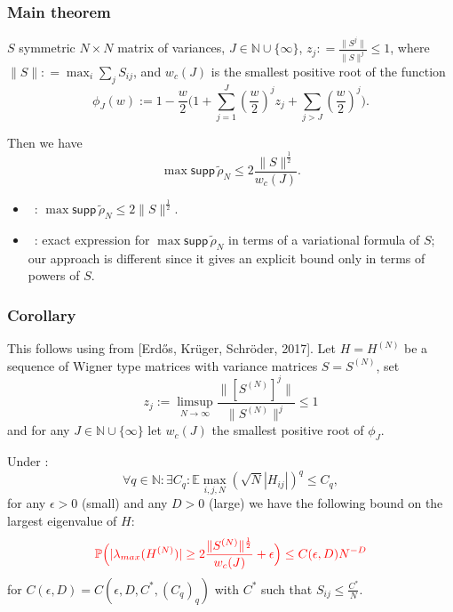 \documentclass{beamer}
\numberwithin{equation}{section}
\newcommand{\deq}{\mathrel{\mathop:}=}
\newcommand{\supp}{\mathsf{supp}\,}
\newcommand{\E}{{\mathbb E }}
\newcommand{\N}{{\mathbb N}}
\renewcommand{\P}{{\mathbb P}}
\newcommand{\Cr}{\color{red}}
\renewcommand{\emph}[1]{{\Cr{#1}}}
\newcommand{\bemph}[1]{\textbf{\Cr{#1}}}
\begin{document}
\begin{frame}
\frametitle{Main theorem}
$S$ symmetric $N\times N$ matrix of variances, $J\in\N\cup\{\infty\}$, $z_j\deq\frac{\|S^j\|}{\|S\|^j}\leq 1$, where $\|S\|\deq\max_i\sum_j S_{ij}$, and $w_c(J)$ is the smallest positive root of the function $$
\phi_J(w):=1-\frac{w}{2}\Big(1+\sum_{j=1}^J\left(\frac{w}{2}\right)^jz_j+\sum_{j>J}\left(\frac{w}{2}\right)^j\Big).$$
	
	Then we have  $$\max\supp\widetilde\rho_N\leq 2\frac{\|S\|^\frac{1}{2}}{w_c(J)}.$$

\bemph{Comparison to existing literature:} 
\begin{itemize}
	\item ~\!: $\max\supp\widetilde\rho_N\leq 2\|S\|^\frac{1}{2}$.
	\item ~\!\![Ottolino 2017]: exact expression for $\max\supp\widetilde\rho_N$ in terms of a variational formula of $S$; our approach is different since it gives an explicit bound only in terms of powers of $S$.
\end{itemize}

\end{frame}

\begin{frame}
\frametitle{Corollary}
This follows using \emph{local laws} from [Erd{\H o}s,  Kr\"uger,  Schr\"oder, 2017].
Let $H=H^{(N)}$ be a sequence of Wigner type matrices with variance matrices $S=S^{(N)}$, set $$
 z_j:= \limsup_{N\to\infty}  \frac{\|[S^{(N)}]^j\|}{\|S^{(N)}\|^j}\leq 1
$$
and for any $J\in \N \cup\{\infty\}$ let $w_c(J)$ the smallest positive root of $\phi_J$.


Under \emph{finite moment assumption}: $$\forall q\in\N:\exists C_q : \E \max_{i,j,N}(\sqrt N |H_{ij}|)^q\leq C_q,$$
for any $\epsilon>0$ (small) and any $D>0$ (large) we have the following bound on the largest eigenvalue of $H$:
$$
  {\color{red}\P \Big(  |\lambda_{max} (H^{(N)})|\ge 2\frac{\|S^{(N)}\|^\frac{1}{2}}{w_c(J)} +\epsilon\Big)  \le C(\epsilon, D) N^{-D}}
 $$
 for $C(\epsilon, D) = C(\epsilon, D, C^*,(C_q)_q)$ with $C^*$ such that $S_{ij}\leq\frac{C^*}{N}$.

\end{frame}
\end{document}
